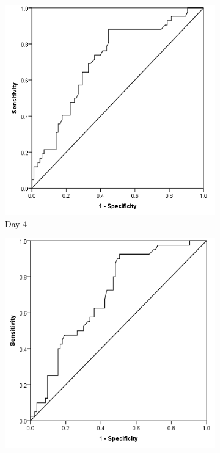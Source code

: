 \begin{figure}[t]
\begin{subfigure}{0.3\textwidth}
		\includegraphics[width=\textwidth]{Figures/crp_comp_ROC_infection_D4}
		\caption{Day 4}
		\label{fig:crp_comp_ROC_infection_D4}
	\end{subfigure}
	\begin{subfigure}{0.3\textwidth}
		\centering
		\includegraphics[width=\textwidth]{Figures/crp_comp_ROC_infection_D5}

\end{subfigure}
\end{figure}

